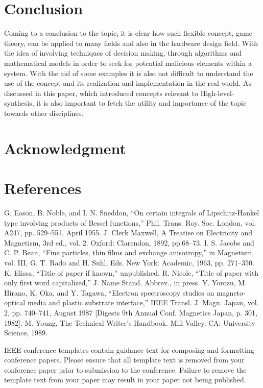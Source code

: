 \documentclass[conference]{IEEEtran}
\begin{document}
\section{Conclusion}
Coming to a conclusion to the topic, it is clear how such flexible concept, game theory, can be applied to many fields and also in the hardware design field. With the idea of involving techniques of decision making, through algorithms and mathematical models in order to seek for potential malicious elements within a system. With the aid of some examples it is also not difficult to understand the use of the concept and its realization and implementation in the real world. As discussed in this paper, which introduced concepts relevant to High-level-synthesis, it is also important to fetch the utility and importance of the topic towards other disciplines.
\section*{Acknowledgment}



\section*{References}




\begin{thebibliography}{00}
 G. Eason, B. Noble, and I. N. Sneddon, ``On certain integrals of Lipschitz-Hankel type involving products of Bessel functions,'' Phil. Trans. Roy. Soc. London, vol. A247, pp. 529--551, April 1955.
 J. Clerk Maxwell, A Treatise on Electricity and Magnetism, 3rd ed., vol. 2. Oxford: Clarendon, 1892, pp.68--73.
 I. S. Jacobs and C. P. Bean, ``Fine particles, thin films and exchange anisotropy,'' in Magnetism, vol. III, G. T. Rado and H. Suhl, Eds. New York: Academic, 1963, pp. 271--350.
 K. Elissa, ``Title of paper if known,'' unpublished.
 R. Nicole, ``Title of paper with only first word capitalized,'' J. Name Stand. Abbrev., in press.
 Y. Yorozu, M. Hirano, K. Oka, and Y. Tagawa, ``Electron spectroscopy studies on magneto-optical media and plastic substrate interface,'' IEEE Transl. J. Magn. Japan, vol. 2, pp. 740--741, August 1987 [Digests 9th Annual Conf. Magnetics Japan, p. 301, 1982].
 M. Young, The Technical Writer's Handbook. Mill Valley, CA: University Science, 1989.
\end{thebibliography}
\vspace{12pt}
\color{red}
IEEE conference templates contain guidance text for composing and formatting conference papers. Please ensure that all template text is removed from your conference paper prior to submission to the conference. Failure to remove the template text from your paper may result in your paper not being published.
\end{document}
